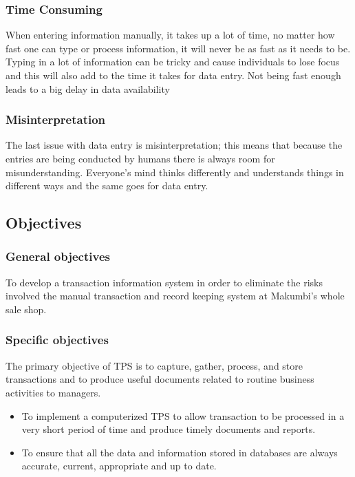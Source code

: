 \documentclass[12pt]{article}
\begin{document}
\subsubsection{Time Consuming}
When entering information manually, it takes up a lot of time, no matter how fast one can type or process information, it will never be as fast as it needs to be. Typing in a lot of information can be tricky and cause individuals to lose focus and this will also add to the time it takes for data entry. Not being fast enough leads to a big delay in data availability
\subsubsection{Misinterpretation}
The last issue with data entry is misinterpretation; this means that because the entries are being conducted by humans there is always room for misunderstanding. Everyone’s mind thinks differently and understands things in different ways and the same goes for data entry.
\subsection{Objectives}
\subsubsection{General objectives}
To develop a transaction information system in order to eliminate the risks involved the manual transaction and record keeping system at Makumbi's whole sale shop.
\subsubsection{Specific objectives}
The primary objective of TPS is to capture, gather, process, and store transactions and to produce useful documents related to routine business activities to managers.
\begin{itemize}
\item To implement a computerized TPS to allow transaction to be processed in a very short period of time and produce timely documents and reports.
\item To ensure that all the data and information stored in databases are always accurate, current, appropriate and up to date.
\end{itemize}
\end{document}
